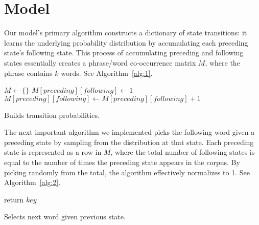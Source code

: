 \documentclass[11pt]{article}
\begin{document}
\section{Model}

Our model's primary algorithm constructs a dictionary of state transitions: it  learns the underlying probability distribution by accumulating each preceding state's following state. This process of accumulating preceding and following states essentially creates a phrase/word co-occurrence matrix \(M\), where the phrase contains \(k\) words. See Algorithm~\ref{alg:1}.

\begin{algorithm}
  \begin{algorithmic}
          {$M \gets \{\}$}
        \EndIf
          {$M[preceding][following] \gets 1$}
        \Else
          {$ M[preceding][following] \gets M[preceding][following]+1$}
        \EndIf
      \EndFor
    \EndFor
    \EndProcedure{}
  \end{algorithmic}
  \caption{Builds transition probabilities.}
  \label{alg:1}
\end{algorithm}

The next important algorithm we implemented picks the following word given a preceding state by sampling from the distribution at that state. Each preceding state is represented as a row in \(M\), where the total number of following states is equal to the number of times the preceding state appears in the corpus. By picking randomly from the total, the algorithm effectively normalizes to 1. See Algorithm~\ref{alg:2}.

\begin{algorithm}
  \begin{algorithmic}

        {return $key$}
      \EndIf
    \EndFor
    \EndProcedure{}
  \end{algorithmic}
  \caption{Selects next word given previous state.}
  \label{alg:2}
\end{algorithm}
\end{document}
